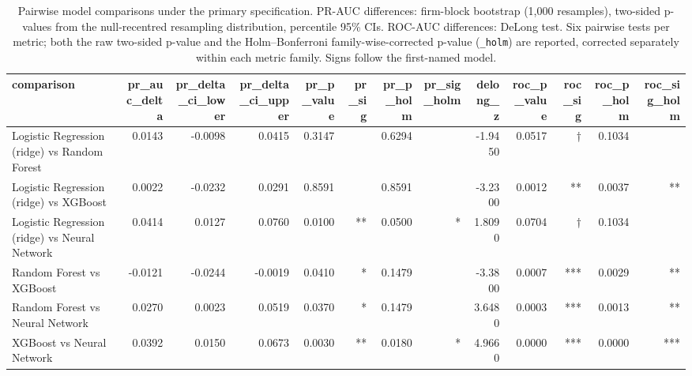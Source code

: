 \begin{table}[htbp]
\centering
\caption{Pairwise model comparisons under the primary specification. PR-AUC differences: firm-block bootstrap (1{,}000 resamples), two-sided p-values from the null-recentred resampling distribution, percentile 95\% CIs. ROC-AUC differences: DeLong test. Six pairwise tests per metric; both the raw two-sided p-value and the Holm--Bonferroni family-wise-corrected p-value (\texttt{\_holm}) are reported, corrected separately within each metric family. Signs follow the first-named model.}
\label{tab:v2_significance_tests}
\small
\begin{tabular}{lrrrrrrrrrrrr}
\toprule
comparison & pr\_auc\_delta & pr\_delta\_ci\_lower & pr\_delta\_ci\_upper & pr\_p\_value & pr\_sig & pr\_p\_holm & pr\_sig\_holm & delong\_z & roc\_p\_value & roc\_sig & roc\_p\_holm & roc\_sig\_holm \\
\midrule
Logistic Regression (ridge) vs Random Forest & 0.0143 & -0.0098 & 0.0415 & 0.3147 &  & 0.6294 &  & -1.9450 & 0.0517 & † & 0.1034 &  \\
Logistic Regression (ridge) vs XGBoost & 0.0022 & -0.0232 & 0.0291 & 0.8591 &  & 0.8591 &  & -3.2300 & 0.0012 & ** & 0.0037 & ** \\
Logistic Regression (ridge) vs Neural Network & 0.0414 & 0.0127 & 0.0760 & 0.0100 & ** & 0.0500 & * & 1.8090 & 0.0704 & † & 0.1034 &  \\
Random Forest vs XGBoost & -0.0121 & -0.0244 & -0.0019 & 0.0410 & * & 0.1479 &  & -3.3800 & 0.0007 & *** & 0.0029 & ** \\
Random Forest vs Neural Network & 0.0270 & 0.0023 & 0.0519 & 0.0370 & * & 0.1479 &  & 3.6480 & 0.0003 & *** & 0.0013 & ** \\
XGBoost vs Neural Network & 0.0392 & 0.0150 & 0.0673 & 0.0030 & ** & 0.0180 & * & 4.9660 & 0.0000 & *** & 0.0000 & *** \\
\bottomrule
\end{tabular}
\end{table}

